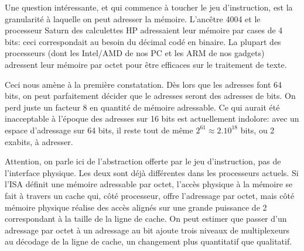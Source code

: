 \documentclass[architecture]{compas2018}
\begin{document}
\iffalse %
La croissance du bus de données a suivi avec du retard, pour plusieurs raisons.
La première est que la loi de Moore doit aussi fournir assez de transistors au processeur pour calculer sur des données de plus en plus grandes.
Mais la complexité des principales opérations d'un processeur travaillant sur $n$ bits est en $n$, en $n\log n$ ou au pire en $n^2$: si l'on a pu être à l'étroit jusque dans les années 90 pour construire un processeur qui peut calculer sur des adresses mémoires, ce n'est plus le cas depuis.
La seconde raison est que les ordinateurs servent beaucoup à travailler sur du texte, donc des octets.
On a donc vu des processeurs très populaires 8/16 bits, c'est à dire $w_d=8$ et  $w_a = 16$: les z80, 6502, 8088; des processeurs 16/32 bits (68000, 80286 à 486); et même une variante 8/32 bits, le 68008. Puis l'industrie a convergé vers 32/32 avec l'arrivée des processeurs RISC  (SPARC,  ARM et Power)  puis et 64/64 avec AMD64 et ARM64.
Ainsi,  
De nos jours, les processeurs ont des registres de plusieurs centaines de bits (AMD64 SSE* puis AVX*, ARM Neon), encore une fois parce que la loi de Moore le permet.
Mais ces registres sont des vecteurs de données d'au plus 64 bits.
\fi



Une question intéressante, et qui commence à toucher le jeu d'instruction, est  la granularité à laquelle on peut adresser la mémoire.
L'ancêtre 4004 et le processeur Saturn des calculettes HP adressaient leur mémoire par cases de 4 bits: ceci correspondait au besoin du décimal codé en binaire.
La plupart des processeurs (dont les Intel/AMD de nos PC et les ARM de nos gadgets) adressent leur mémoire par octet pour être efficaces sur le traitement de texte.

Ceci nous amène à la première constatation. Dès lors que les adresses font 64 bits, on peut parfaitement décider  que le adresses seront des adresses de bits.
On perd juste un facteur 8 en quantité de mémoire adressable.
Ce qui aurait été inacceptable à l'époque des adresses sur 16 bits est actuellement indolore: avec un espace d'adressage sur 64 bits, il reste tout de même $2^{61}\approx 2.10^{18}$ bits, ou 2 exabits, à adresser.


Attention, on parle ici de l'abstraction offerte par le jeu d'instruction, pas de l'interface physique.
Les deux sont déjà différentes dans les processeurs actuels.
Si l'ISA définit une mémoire adressable par octet, l'accès physique à la mémoire se fait à travers un cache qui, côté processeur, offre l'adressage par octet, mais côté mémoire physique  réalise des accès alignés sur une grande puissance de 2 correspondant à la taille de la ligne de cache.
 On peut estimer que passer d'un adressage par octet à un adressage au bit ajoute trois niveaux de multiplexeurs au décodage de la ligne de cache, un changement plus quantitatif que qualitatif.
\end{document}
